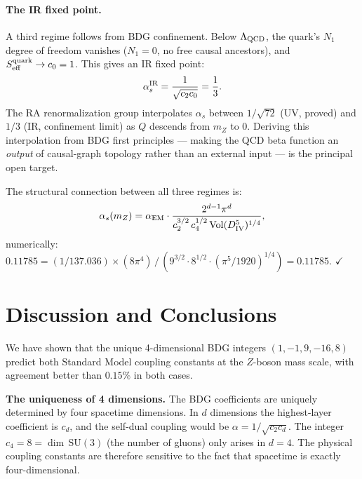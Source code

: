 \documentclass[12pt,a4paper]{article}
\theoremstyle{definition}
\begin{document}
\paragraph{The IR fixed point.}
A third regime follows from BDG confinement.  Below $\Lambda_{\rm QCD}$,
the quark's $N_1$ degree of freedom vanishes ($N_1=0$, no free causal
ancestors), and $S_{\rm eff}^{\rm quark}\to c_0 = 1$.  This gives an
IR fixed point:
\begin{equation}
  \alpha_s^{\rm IR} = \frac{1}{\sqrt{c_2 c_0}} = \frac{1}{3}.
  \label{eq:alpha_IR_bdg}
\end{equation}
The RA renormalization group interpolates $\alpha_s$ between $1/\sqrt{72}$
(UV, proved) and $1/3$ (IR, confinement limit) as $Q$ descends from $m_Z$
to $0$.  Deriving this interpolation from BDG first principles --- making
the QCD beta function an \emph{output} of causal-graph topology rather than
an external input --- is the principal open target.

The structural connection between all three regimes is:
\begin{equation}
  \label{eq:connection}
  \alpha_s(m_Z) = \alpha_{\rm EM}
  \cdot \frac{2^{d-1}\pi^d}{c_2^{3/2}\,c_4^{1/2}\,\mathrm{Vol}(D_{\rm IV}^5)^{1/4}},
\end{equation}
numerically: $0.11785 = (1/137.036) \times (8\pi^4)\,/\,(9^{3/2}\cdot 8^{1/2}\cdot
(\pi^5/1920)^{1/4}) = 0.11785$. $\checkmark$

\section{Discussion and Conclusions}
\label{sec:conc}

We have shown that the unique 4-dimensional BDG integers $(1,-1,9,-16,8)$
predict both Standard Model coupling constants at the $Z$-boson mass scale,
with agreement better than $0.15\%$ in both cases.

\medskip

\noindent\textbf{The uniqueness of 4 dimensions.}  The BDG coefficients
are uniquely determined by four spacetime dimensions.  In $d$ dimensions
the highest-layer coefficient is $c_d$, and the self-dual coupling would
be $\alpha = 1/\!\sqrt{c_2 c_d}$.  The integer $c_4 = 8 = \dim\,\mathrm{SU}(3)$
(the number of gluons) only arises in $d=4$.  The physical coupling
constants are therefore sensitive to the fact that spacetime is exactly
four-dimensional.
\end{document}
